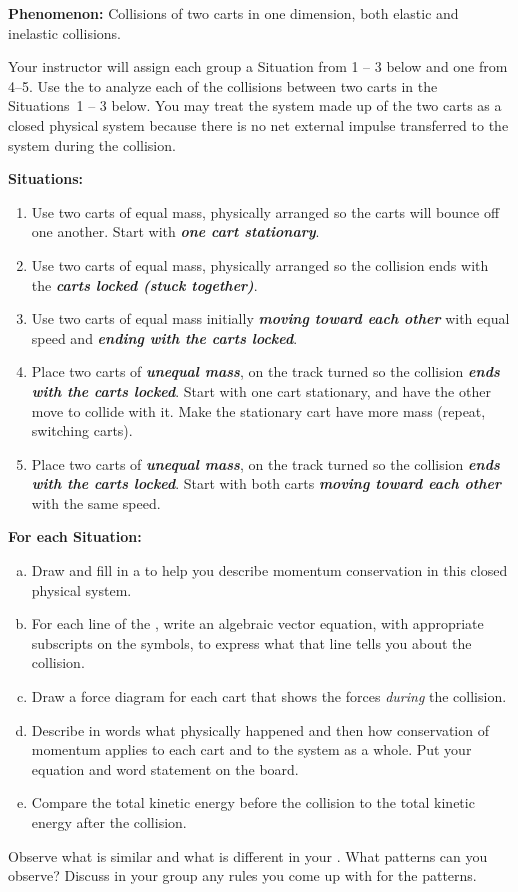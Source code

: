 \textbf{Phenomenon:} Collisions of two carts in one dimension, both elastic and inelastic collisions.

Your instructor will assign each group a Situation from 1 -- 3 below and one from 4--5. Use the \pConsModel{} to analyze each of the collisions between two carts in the Situations~1 -- 3 below. You may treat the system made up of the two carts as a closed physical system because there is no net external impulse transferred to the system during the collision.

\noindent
\textbf{Situations:}
\begin{enumerate}
	\item Use two carts of equal mass, physically arranged so the carts will bounce off one another. Start with \textbf{\em one cart stationary}.
	\item Use two carts of equal mass, physically arranged so the collision ends with the \textbf{\em carts locked (stuck together)}.
	\item Use two carts of equal mass initially \textbf{\em moving toward each other} with equal speed and \textbf{\em ending with the carts locked}.
	\item Place two carts of \textbf{\em unequal mass}, on the track turned so the collision \textbf{\em ends with the carts locked}. Start with one cart stationary, and have the other move to collide with it. Make the stationary cart have more mass (repeat, switching carts).
	\item Place two carts of \textbf{\em unequal mass}, on the track turned so the collision \textbf{\em ends with the carts locked}. Start with both carts \textbf{\em moving toward each other} with the same speed.
\end{enumerate}

\noindent
\textbf{For each Situation:}
\begin{enumerate}[(a)]
	\item Draw and fill in a \pchart{} to help you describe momentum conservation in this closed physical system.
	\item For each line of the \pchart{}, write an algebraic vector equation, with appropriate subscripts on the symbols, to express what that line tells you about the collision.
	\item Draw a force diagram for each cart that shows the forces \emph{during} the collision.
	\item Describe in words what physically happened and then how conservation of momentum applies to each cart and to the system as a whole. Put your equation and word statement on the board.
	\item Compare the total kinetic energy before the collision to the total kinetic energy after the collision.%
\end{enumerate}

Observe what is similar and what is different in your \pcharts{}. What patterns can you observe? Discuss in your group any rules you come up with for the patterns.

\WCD